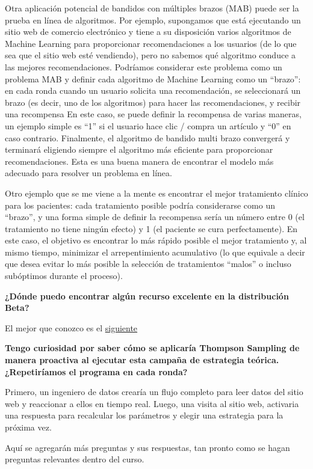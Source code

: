 \documentclass[]{book}
\begin{document}
Otra aplicación potencial de bandidos con múltiples brazos (MAB) puede ser la prueba en línea de algoritmos. Por ejemplo, supongamos que está ejecutando un sitio web de comercio electrónico y tiene a su disposición varios algoritmos de Machine Learning para proporcionar recomendaciones a los usuarios (de lo que sea que el sitio web esté vendiendo), pero no sabemos qué algoritmo conduce a las mejores recomendaciones. Podríamos considerar este problema como un problema MAB y definir cada algoritmo de Machine Learning como un ``brazo'': en cada ronda cuando un usuario solicita una recomendación, se seleccionará un brazo (es decir, uno de los algoritmos) para hacer las recomendaciones, y recibir una recompensa En este caso, se puede definir la recompensa de varias maneras, un ejemplo simple es ``1'' si el usuario hace clic / compra un artículo y ``0'' en caso contrario. Finalmente, el algoritmo de bandido multi brazo convergerá y terminará eligiendo siempre el algoritmo más eficiente para proporcionar recomendaciones. Esta es una buena manera de encontrar el modelo más adecuado para resolver un problema en línea.

Otro ejemplo que se me viene a la mente es encontrar el mejor tratamiento clínico para los pacientes: cada tratamiento posible podría considerarse como un ``brazo'', y una forma simple de definir la recompensa sería un número entre 0 (el tratamiento no tiene ningún efecto) y 1 (el paciente se cura perfectamente). En este caso, el objetivo es encontrar lo más rápido posible el mejor tratamiento y, al mismo tiempo, minimizar el arrepentimiento acumulativo (lo que equivale a decir que desea evitar lo más posible la selección de tratamientos ``malos'' o incluso subóptimos durante el proceso).

\textbf{¿Dónde puedo encontrar algún recurso excelente en la distribución Beta?}

El mejor que conozco es el \href{https://stats.stackexchange.com/questions/47771/what-is-the-intuition-behind-beta-distribution}{siguiente}

\textbf{Tengo curiosidad por saber cómo se aplicaría Thompson Sampling de manera proactiva al ejecutar esta campaña de estrategia teórica. ¿Repetiríamos el programa en cada ronda?}

Primero, un ingeniero de datos crearía un flujo completo para leer datos del sitio web y reaccionar a ellos en tiempo real. Luego, una visita al sitio web, activaria una respuesta para recalcular los parámetros y elegir una estrategia para la próxima vez.

Aquí se agregarán más preguntas y sus respuestas, tan pronto como se hagan preguntas relevantes dentro del curso.


\end{document}

